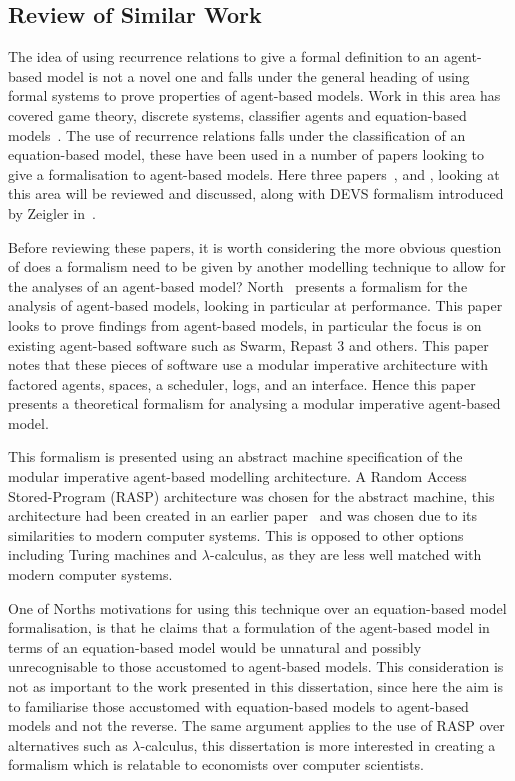 \documentclass{article}
\begin{document}
\subsection{Review of Similar Work}\label{simwork}
The idea of using recurrence relations to give a formal definition to an agent-based model is not a novel one and falls under the general heading of using formal systems to prove properties of agent-based models. Work in this area has covered game theory, discrete systems, classifier agents and equation-based models~\cite{taabm}. The use of recurrence relations falls under the classification of an equation-based model, these have been used in a number of papers looking to give a formalisation to agent-based models. Here three papers~\cite{ebmabmi}, \cite{econmistsnoabm} and \cite{abmtsd}, looking at this area will be reviewed and discussed, along with DEVS formalism introduced by Zeigler in~\cite{introdevs}.

Before reviewing these papers, it is worth considering the more obvious question of does a formalism need to be given by another modelling technique to allow for the analyses of an agent-based model? North~\cite{taabm} present\textsc{}s a formalism for the analysis of agent-based models, looking in particular at performance. This paper looks to prove findings from agent-based models, in particular the focus is on existing agent-based software such as Swarm, Repast 3 and others. This paper notes that these pieces of software use a modular imperative architecture with factored agents, spaces, a scheduler, logs, and an interface. Hence this paper presents a theoretical formalism for analysing a modular imperative agent-based model.    

This formalism is presented using an abstract machine specification of the modular imperative agent-based modelling architecture. A  Random Access Stored-Program (RASP) architecture was chosen for the abstract machine, this architecture had been created in an earlier paper~\cite{raspceated} and was chosen due to its similarities to modern computer systems. This is opposed to other options including Turing machines and $\lambda$-calculus, as they are less well matched with modern computer systems.     

One of North\textsc{}s motivations for using this technique over an equation-based model formalisation, is that he claims that a formulation of the agent-based model in terms of an equation-based model would be unnatural and possibly unrecognisable to those accustomed to agent-based models. This consideration is not as important to the work presented in this dissertation, since here the aim is to familiarise those accustomed with equation-based models to agent-based models and not the reverse. The same argument applies to the use of RASP over alternatives such as $\lambda$-calculus, this dissertation is more interested in creating a formalism which is relatable to economists over computer scientists.   
\end{document}
